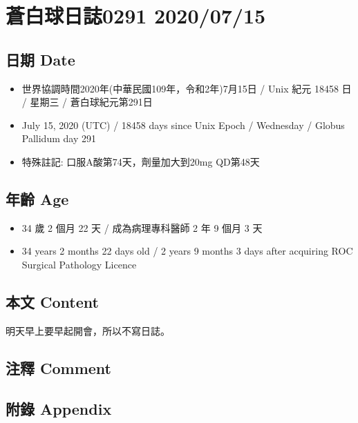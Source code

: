 \documentclass[
]{article}
\providecommand{\tightlist}{%
  \setlength{\itemsep}{0pt}\setlength{\parskip}{0pt}}
\begin{document}
\hypertarget{ux84bcux767dux7403ux65e5ux8a8c0291-20200715}{%
\section{蒼白球日誌0291
2020/07/15}\label{ux84bcux767dux7403ux65e5ux8a8c0291-20200715}}

\hypertarget{ux65e5ux671f-date-14}{%
\subsection{日期 Date}\label{ux65e5ux671f-date-14}}

\begin{itemize}
\tightlist
\item
  世界協調時間2020年(中華民國109年，令和2年)7月15日 / Unix 紀元 18458 日
  / 星期三 / 蒼白球紀元第291日
\item
  July 15, 2020 (UTC) / 18458 days since Unix Epoch / Wednesday / Globus
  Pallidum day 291
\item
  特殊註記: 口服A酸第74天，劑量加大到20mg QD第48天
\end{itemize}

\hypertarget{ux5e74ux9f61-age-14}{%
\subsection{年齡 Age}\label{ux5e74ux9f61-age-14}}

\begin{itemize}
\tightlist
\item
  34 歲 2 個月 22 天 / 成為病理專科醫師 2 年 9 個月 3 天
\item
  34 years 2 months 22 days old / 2 years 9 months 3 days after
  acquiring ROC Surgical Pathology Licence
\end{itemize}

\hypertarget{ux672cux6587-content-14}{%
\subsection{本文 Content}\label{ux672cux6587-content-14}}

明天早上要早起開會，所以不寫日誌。

\hypertarget{ux6ce8ux91cb-comment-14}{%
\subsection{注釋 Comment}\label{ux6ce8ux91cb-comment-14}}

\hypertarget{ux9644ux9304-appendix-14}{%
\subsection{附錄 Appendix}\label{ux9644ux9304-appendix-14}}
\end{document}
